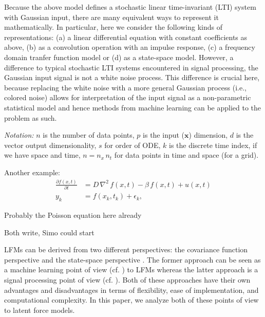 \documentclass[journal]{IEEEtran}
\newcommand{\simo}[1]{{\color{red}#1}}
\begin{document}
Because the above model defines a stochastic linear time-invariant (LTI) system with Gaussian input, there are many equivalent ways to represent it mathematically. In particular, here we consider the following kinds of representations: (a) a linear differential equation with constant coefficients as above, (b) as a convolution operation with an impulse response, (c) a frequency domain tranfer function model or (d) as a state-space model. However, a difference to typical stochastic LTI systems encountered in signal processing, the Gaussian input signal is not a white noise process. This difference is crucial here, because replacing the white noise with a more general Gaussian process (i.e., colored noise) allows for interpretation of the input signal as a non-parametric statistical model and hence methods from machine learning can be applied to the problem as such.


{\em Notation:} $n$ is the number of data points, $p$ is the input ($\mathbf{x}$) dimension, $d$ is the vector output dimensionality, $s$ for order of ODE, $k$ is the discrete time index, if we have space and time, $n = n_x \, n_t$ for data points in time and space (for a grid).

Another example:
%
\begin{equation}
\begin{split}
  \frac{\partial f(x,t)}{\partial t} &=
  D \, \nabla^2 \, f(x,t) - \beta \, f(x,t) + u(x,t) \\
  y_k &= f(x_k,t_k) + \epsilon_k,
\end{split}
\end{equation}

\simo{Probably the Poisson equation here already}

\simo{Both write, Simo could start}

LFMs can be derived from two different perspectives: the covariance function perspective \cite{Alvarez+Lawrence:2009,Alvarez+Luengo+Lawrence:2013} and the state-space perspective \cite{Hartikainen+Sarkka:2011,Hartikainen+Seppanen+Sarkka:2012}. The former approach can be seen as a machine learning point of view (cf. \cite{Rasmussen+Williams:2006}) to LFMs whereas the latter approach is a signal processing point of view (cf. \cite{Sarkka+Solin+Hartikainen:2013,Sarkka:2013}). Both of these approaches have their own advantages and disadvantages in terms of flexibility, ease of implementation, and computational complexity. In this paper, we analyze both of these points of view to latent force models.
\end{document}
